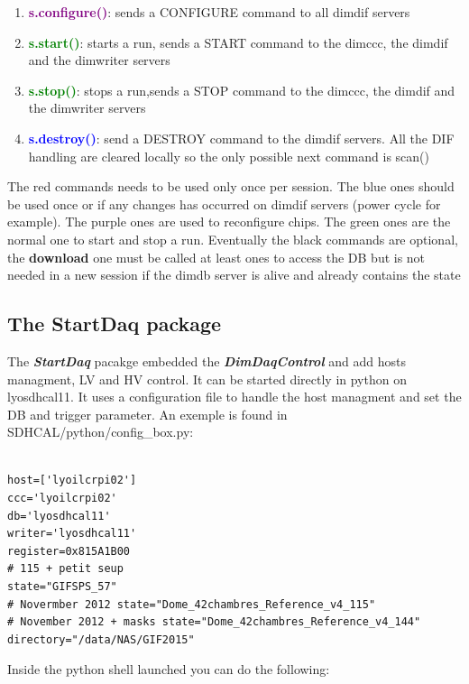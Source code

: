\documentclass[english]{article}
\begin{document}
\begin{enumerate}
\item \textcolor{purple}{\bf s.configure()}: sends a CONFIGURE command to all dimdif servers




\item \textcolor{green}{\bf s.start()}: starts a run, sends a START command to the dimccc, the dimdif and the dimwriter servers 

\item \textcolor{green}{\bf s.stop()}: stops a run,sends a STOP command to the dimccc, the dimdif and the dimwriter servers
\item \textcolor{blue}{\bf s.destroy()}: send a DESTROY command to the dimdif servers. All the DIF handling are cleared locally so the only possible next command is scan()
\end{enumerate} 

The red commands needs to be used only once per session. The blue ones should be used once or if any changes has occurred on dimdif servers (power cycle for example). The purple ones are used to reconfigure chips. The green ones are the normal one to start and stop a run. Eventually the black commands are optional, the {\bf download} one must be called at least ones to access the DB but is not needed in a new session if the dimdb server is alive and already contains the state 

\subsection{ The StartDaq package }
The {\bf \sl StartDaq} pacakge embedded the { \bf \sl DimDaqControl }  and add hosts managment, LV and HV control. It can be started directly in python on lyosdhcal11. It uses a configuration file to handle the host managment and set the DB and trigger parameter. An exemple is found in SDHCAL/python/config\_box.py:

\begin{verbatim}

host=['lyoilcrpi02']
ccc='lyoilcrpi02'
db='lyosdhcal11'
writer='lyosdhcal11'
register=0x815A1B00
# 115 + petit seup
state="GIFSPS_57"
# Novermber 2012 state="Dome_42chambres_Reference_v4_115"
# November 2012 + masks state="Dome_42chambres_Reference_v4_144"
directory="/data/NAS/GIF2015"

\end{verbatim}


Inside the python shell launched you can do the following:
\end{document}
